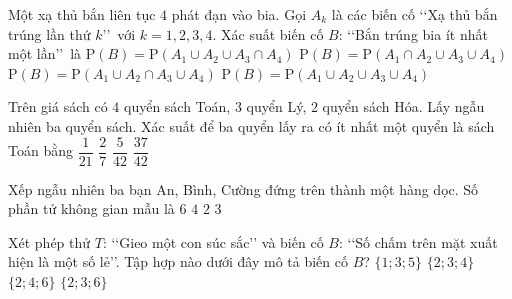\begin{ex}%
	Một xạ thủ bắn liên tục $4$ phát đạn vào bia. Gọi $A_k$ là các biến cố \lq\lq Xạ thủ bắn trúng lần thứ $k$\rq\rq \, với $k=1,2,3,4$. Xác suất biến cố $B$: \lq\lq Bắn trúng bia ít nhất một lần\rq\rq \, là
	\choice
	{$\mathrm{P}(B)=\mathrm{P}(A_1 \cup A_2 \cup A_3 \cap A_4)$}
	{$\mathrm{P}(B)=\mathrm{P}(A_1 \cap A_2 \cup A_3 \cup A_4)$}
	{$\mathrm{P}(B)=\mathrm{P}(A_1 \cup A_2 \cap A_3 \cup A_4)$}
	{\True $\mathrm{P}(B)=\mathrm{P}(A_1 \cup A_2 \cup A_3 \cup A_4)$}
\end{ex}
\begin{ex}%
	Trên giá sách có $4$ quyển sách Toán, $3$ quyển Lý, $2$ quyển sách Hóa. Lấy ngẫu nhiên ba quyển sách. Xác suất để ba quyển lấy ra có ít nhất một quyển là sách Toán bằng
	\choice
	{$\dfrac{1}{21}$} 
	{$\dfrac{2}{7}$}
	{$\dfrac{5}{42}$}
	{\True $\dfrac{37}{42}$}
\end{ex}
\begin{ex}%
	Xếp ngẫu nhiên ba bạn An, Bình, Cường đứng trên thành một hàng dọc. Số phần tử không gian mẫu là
	\choice
	{\True $6$}
	{$4$}
	{$2$}
	{$3$}	
\end{ex}
\begin{ex}%
	Xét phép thử $T$: \lq\lq Gieo một con súc sắc\rq\rq\;  và biến cố $B$: \lq\lq Số chấm trên mặt xuất hiện là một số lẻ\rq\rq. Tập hợp nào dưới đây mô tả biến cố $B$?
	\choice
	{\True $\{1;3;5\}$}
	{$\{2;3;4\}$}
	{$\{2;4;6\}$}
	{$\{2;3;6\}$}	
\end{ex}
